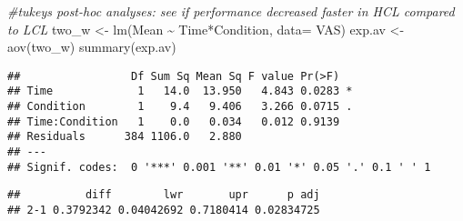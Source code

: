 \documentclass[
]{article}
\newenvironment{Shaded}{\begin{snugshade}}{\end{snugshade}}
\newcommand{\AttributeTok}[1]{\textcolor[rgb]{0.77,0.63,0.00}{#1}}
\newcommand{\CommentTok}[1]{\textcolor[rgb]{0.56,0.35,0.01}{\textit{#1}}}
\newcommand{\FunctionTok}[1]{\textcolor[rgb]{0.00,0.00,0.00}{#1}}
\newcommand{\NormalTok}[1]{#1}
\newcommand{\OtherTok}[1]{\textcolor[rgb]{0.56,0.35,0.01}{#1}}
\newcommand{\SpecialCharTok}[1]{\textcolor[rgb]{0.00,0.00,0.00}{#1}}
\newcommand{\StringTok}[1]{\textcolor[rgb]{0.31,0.60,0.02}{#1}}
\begin{document}
\begin{Shaded}
\begin{Highlighting}[]
\CommentTok{\#tukey\textquotesingle{}s post{-}hoc analyses: see if performance decreased faster in HCL compared to LCL}
\NormalTok{two\_w }\OtherTok{\textless{}{-}} \FunctionTok{lm}\NormalTok{(Mean }\SpecialCharTok{\textasciitilde{}}\NormalTok{ Time}\SpecialCharTok{*}\NormalTok{Condition, }\AttributeTok{data=}\NormalTok{ VAS)}
\NormalTok{exp.av }\OtherTok{\textless{}{-}} \FunctionTok{aov}\NormalTok{(two\_w)}
\FunctionTok{summary}\NormalTok{(exp.av)}
\end{Highlighting}
\end{Shaded}

\begin{verbatim}
##                 Df Sum Sq Mean Sq F value Pr(>F)  
## Time             1   14.0  13.950   4.843 0.0283 *
## Condition        1    9.4   9.406   3.266 0.0715 .
## Time:Condition   1    0.0   0.034   0.012 0.9139  
## Residuals      384 1106.0   2.880                 
## ---
## Signif. codes:  0 '***' 0.001 '**' 0.01 '*' 0.05 '.' 0.1 ' ' 1
\end{verbatim}

\begin{Shaded}
\end{Shaded}

\begin{verbatim}
##          diff        lwr       upr      p adj
## 2-1 0.3792342 0.04042692 0.7180414 0.02834725
\end{verbatim}

\begin{Shaded}
\end{Shaded}
\end{document}
